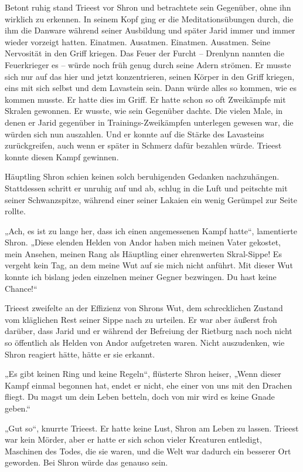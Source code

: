 Betont ruhig stand Trieest vor Shron und betrachtete sein Gegenüber, ohne ihn wirklich zu erkennen. In seinem Kopf ging er die Meditationsübungen durch, die ihm die Danware während seiner Ausbildung und später Jarid immer und immer wieder vorzeigt hatten. Einatmen. Ausatmen. Einatmen. Ausatmen. Seine Nervosität in den Griff kriegen. Das Feuer der Furcht – Drenlynn nannten die Feuerkrieger es – würde noch früh genug durch seine Adern strömen. Er musste sich nur auf das hier und jetzt konzentrieren, seinen Körper in den Griff kriegen, eins mit sich selbst und dem Lavastein sein. Dann würde alles so kommen, wie es kommen musste. Er hatte dies im Griff. Er hatte schon so oft Zweikämpfe mit Skralen gewonnen. Er wusste, wie sein Gegenüber dachte. Die vielen Male, in denen er Jarid gegenüber in Trainings-Zweikämpfen unterlegen gewesen war, die würden sich nun auszahlen. Und er konnte auf die Stärke des Lavasteins zurückgreifen, auch wenn er später in Schmerz dafür bezahlen würde. Trieest konnte diesen Kampf gewinnen.

Häuptling Shron schien keinen solch beruhigenden Gedanken nachzuhängen. Stattdessen schritt er unruhig auf und ab, schlug in die Luft und peitschte mit seiner Schwanzspitze, während einer seiner Lakaien ein wenig Gerümpel zur Seite rollte.

„Ach, es ist zu lange her, dass ich einen angemessenen Kampf hatte“, lamentierte Shron. „Diese elenden Helden von Andor haben mich meinen Vater gekostet, mein Ansehen, meinen Rang als Häuptling einer ehrenwerten Skral-Sippe! Es vergeht kein Tag, an dem meine Wut auf sie mich nicht anführt. Mit dieser Wut konnte ich bislang jeden einzelnen meiner Gegner bezwingen. Du hast keine Chance!“

Trieest zweifelte an der Effizienz von Shrons Wut, dem schrecklichen Zustand vom kläglichen Rest seiner Sippe nach zu urteilen. Er war aber äußerst froh darüber, dass Jarid und er während der Befreiung der Rietburg nach noch nicht so öffentlich als Helden von Andor aufgetreten waren. Nicht auszudenken, wie Shron reagiert hätte, hätte er sie erkannt.

„Es gibt keinen Ring und keine Regeln“, flüsterte Shron heiser, „Wenn dieser Kampf einmal begonnen hat, endet er nicht, ehe einer von uns mit den Drachen fliegt. Du magst um dein Leben betteln, doch von mir wird es keine Gnade geben.“

„Gut so“, knurrte Trieest. Er hatte keine Lust, Shron am Leben zu lassen. Trieest war kein Mörder, aber er hatte er sich schon vieler Kreaturen entledigt, Maschinen des Todes, die sie waren, und die Welt war dadurch ein besserer Ort geworden. Bei Shron würde das genauso sein.

